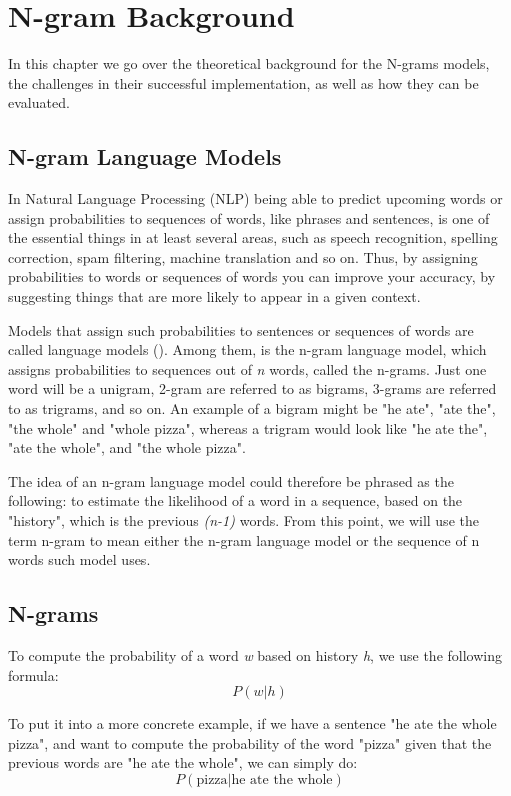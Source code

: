 \chapter{N-gram Background}
\label{chap:N-gram Background}

In this chapter we go over the theoretical background for the N-grams models, the challenges in their successful implementation, as well as how they can be evaluated.

\section{N-gram Language Models}
In Natural Language Processing (NLP) being able to predict upcoming words or assign probabilities to sequences of words, like phrases and sentences, is one of the essential things in at least several areas, such as speech recognition, spelling correction, spam filtering, machine translation and so on. Thus, by assigning probabilities to words or sequences of words you can improve your accuracy, by suggesting things that are more likely to appear in a given context.

Models that assign such probabilities to sentences or sequences of words are called language models (\cite{Jura09a}). Among them, is the n-gram language model, which assigns probabilities to sequences out of \textit{n} words, called the n-grams. Just one word will be a unigram, 2-gram are referred to as bigrams, 3-grams are referred to as trigrams, and so on. An example of a bigram might be "he ate", "ate the", "the whole" and "whole pizza", whereas a trigram would look like "he ate the", "ate the whole", and "the whole pizza". 

The idea of an n-gram language model could therefore be phrased as the following: to estimate the likelihood of a word in a sequence, based on the "history", which is the previous \textit{(n-1)} words. From this point, we will use the term n-gram to mean either the n-gram language model or the sequence of n words such model uses.

\section{N-grams}
To compute the probability of a word \textit{w} based on history \textit{h}, we use the following formula:
\begin{equation}
    P(w|h)
\end{equation}

To put it into a more concrete example, if we have a sentence "he ate the whole pizza", and want to compute the probability of the word "pizza" given that the previous words are "he ate the whole", we can simply do:
\begin{equation}
    P(\text{pizza}|\text{he ate the whole})
\end{equation}

